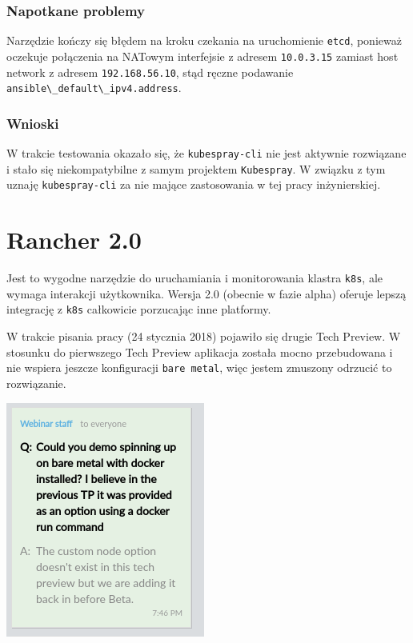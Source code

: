 \documentclass[a4paper,12pt,twoside,openany]{report}
\newcommand{\passthrough}[1]{#1}
\begin{document}
\hypertarget{napotkane-problemy}{%
\subsubsection{Napotkane problemy}\label{napotkane-problemy}}

Narzędzie kończy się błędem na kroku czekania na uruchomienie
\passthrough{\lstinline!etcd!}, ponieważ oczekuje połączenia na NATowym
interfejsie z adresem \passthrough{\lstinline!10.0.3.15!} zamiast host
network z adresem \passthrough{\lstinline!192.168.56.10!}, stąd ręczne
podawanie \passthrough{\lstinline!ansible\_default\_ipv4.address!}.

\hypertarget{wnioski-1}{%
\subsubsection{Wnioski}\label{wnioski-1}}

W trakcie testowania okazało się, że
\passthrough{\lstinline!kubespray-cli!} nie jest aktywnie rozwiązane i
stało się niekompatybilne z samym projektem
\passthrough{\lstinline!Kubespray!}. W związku z tym uznaję
\passthrough{\lstinline!kubespray-cli!} za nie mające zastosowania w tej
pracy inżynierskiej.

\hypertarget{rancher-kubernetes}{%
\section{Rancher 2.0}\label{rancher-kubernetes}}

Jest to wygodne narzędzie do uruchamiania i monitorowania klastra
\passthrough{\lstinline!k8s!}, ale wymaga interakcji użytkownika. Wersja
2.0 (obecnie w fazie alpha) oferuje lepszą integrację z
\passthrough{\lstinline!k8s!} całkowicie porzucając inne platformy.

W trakcie pisania pracy (24 stycznia 2018) pojawiło się drugie Tech
Preview. W stosunku do pierwszego Tech Preview aplikacja została mocno
przebudowana i nie wspiera jeszcze konfiguracji
\passthrough{\lstinline!bare metal!}, więc jestem zmuszony odrzucić to
rozwiązanie.

\includegraphics{assets/rancher-tp2-baremetal.png}\\
\end{document}
